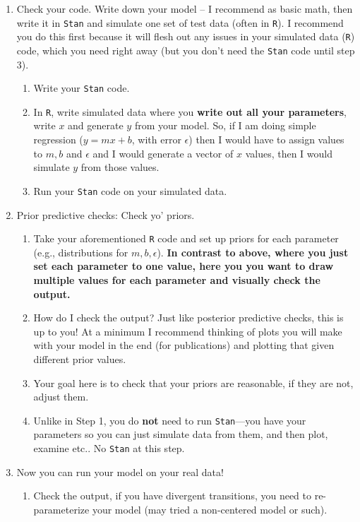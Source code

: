 \documentclass[11pt]{article}
\begin{document}
\begin{enumerate}
\item Check your code. Write down your model -- I recommend as basic math, then write it in \verb|Stan| and simulate one set of test data (often in \verb|R|). I recommend you do this first because it will flesh out any issues in your simulated data (\verb|R|) code, which you need right away (but you don't need the \verb|Stan| code until step 3).
\begin{enumerate}
\item Write your \verb|Stan| code.
\item In \verb|R|, write simulated data where you {\bf write out all your parameters}, write $x$ and generate $y$ from your model. So, if I am doing simple regression ($y=mx+b$, with error $\epsilon$) then I would have to assign values to $m, b$ and $\epsilon$ and I would generate a vector of $x$ values, then I would simulate $y$ from those values.
\item Run your \verb|Stan| code on your simulated data. 
\end{enumerate}
\item Prior predictive checks: Check yo' priors.
\begin{enumerate}
\item Take your aforementioned \verb|R| code and set up priors for each parameter (e.g., distributions for $m, b, \epsilon$). {\bf In contrast to above, where you just set each parameter to one value, here you you want to draw multiple values for each parameter and visually check the output.} 
\item How do I check the output? Just like posterior predictive checks, this is up to you! At a minimum I recommend thinking of plots you will make with your model in the end (for publications) and plotting that given different prior values.
\item Your goal here is to check that your priors are reasonable, if they are not, adjust them. 
\item Unlike in Step 1, you do {\bf not} need to run \verb|Stan|---you have your parameters so you can just simulate data from them, and then plot, examine etc.. No \verb|Stan| at this step. 
\end{enumerate}
\item Now you can run your model on your real data!
\begin{enumerate}
\item Check the output, if you have divergent transitions, you need to re-parameterize your model (may tried a non-centered model or such).

\end{enumerate}
\end{enumerate}
\end{document}
